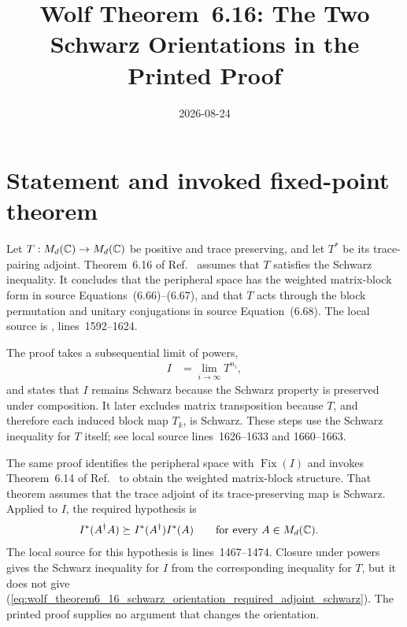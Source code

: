 \documentclass{article}
\title{Wolf Theorem~6.16: The Two Schwarz Orientations in the Printed Proof}
\author{}
\date{2026-08-24}
\begin{document}
\maketitle
{}

\section{Statement and invoked fixed-point theorem}

Let $T:M_{d}(\mathbb{C})\to M_{d}(\mathbb{C})$ be positive and trace preserving, and let $T^*$ be its
trace-pairing adjoint. Theorem~6.16 of Ref.~\cite{Wolf2012Quantum} assumes that
$T$ satisfies the Schwarz inequality. It concludes that the peripheral space
has the weighted matrix-block form in source Equations~(6.66)--(6.67), and
that $T$ acts through the block permutation and unitary conjugations in source
Equation~(6.68). The local source is
,
lines~1592--1624.

The proof takes a subsequential limit of powers,
\begin{align}
  I
    &=\lim_{i\to\infty}T^{n_i},
  \label{eq:wolf_theorem6_16_schwarz_orientation_recurrent_projection}
\end{align}
and states that $I$ remains Schwarz because the Schwarz property is preserved
under composition. It later excludes matrix transposition because $T$, and
therefore each induced block map $T_k$, is Schwarz. These steps use the
Schwarz inequality for $T$ itself; see local source lines~1626--1633 and
1660--1663.

The same proof identifies the peripheral space with $\operatorname{Fix}(I)$
and invokes Theorem~6.14 of Ref.~\cite{Wolf2012Quantum} to obtain the weighted
matrix-block structure. That theorem assumes that the trace adjoint of its
trace-preserving map is Schwarz. Applied to $I$, the required hypothesis is
\begin{align}
  I^*(A^\dagger A)
    &\succeq I^*(A^\dagger)I^*(A)
    \qquad\text{for every }A\in M_{d}(\mathbb{C}).
  \label{eq:wolf_theorem6_16_schwarz_orientation_required_adjoint_schwarz}
\end{align}
The local source for this hypothesis is lines~1467--1474. Closure under powers
gives the Schwarz inequality for $I$ from the corresponding inequality for
$T$, but it does not give
(\ref{eq:wolf_theorem6_16_schwarz_orientation_required_adjoint_schwarz}).
The printed proof supplies no argument that changes the orientation.
\end{document}
